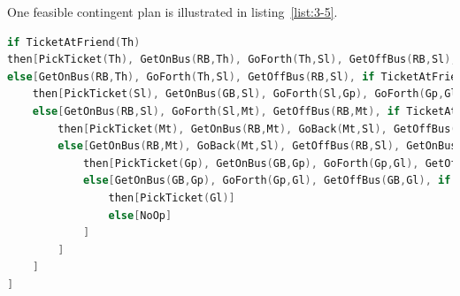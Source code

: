 \documentclass[11pt,a4paper]{article}
\begin{document}
\par One feasible contingent plan is illustrated in listing~\ref{list:3-5}.
\begin{lstlisting}[language=C++, caption={One feasible contingent plan.}, label=list:3-5]
if TicketAtFriend(Th)
then[PickTicket(Th), GetOnBus(RB,Th), GoForth(Th,Sl), GetOffBus(RB,Sl), GetOnBus(GB,Sl), GoForth(Sl,Gp), GoForth(Gp,Gl), GetOffBus(GB,Gl)]
else[GetOnBus(RB,Th), GoForth(Th,Sl), GetOffBus(RB,Sl), if TicketAtFriend(Sl)
	then[PickTicket(Sl), GetOnBus(GB,Sl), GoForth(Sl,Gp), GoForth(Gp,Gl), GetOffBus(GB,Gl)]
	else[GetOnBus(RB,Sl), GoForth(Sl,Mt), GetOffBus(RB,Mt), if TicketAtFriend(Mt)
		then[PickTicket(Mt), GetOnBus(RB,Mt), GoBack(Mt,Sl), GetOffBus(RB,Sl), GetOnBus(GB,Sl), GoForth](Sl,Gp), GoForth(Gp,Gl), GetOffBus(GB,Gl)]
		else[GetOnBus(RB,Mt), GoBack(Mt,Sl), GetOffBus(RB,Sl), GetOnBus(GB,Sl), GoForth](Sl,Gp), GetOffBus(GB,Gp), if TicketAtFriend(Gp)
			then[PickTicket(Gp), GetOnBus(GB,Gp), GoForth(Gp,Gl), GetOffBus(GB,Gl)]
			else[GetOnBus(GB,Gp), GoForth(Gp,Gl), GetOffBus(GB,Gl), if TicketAtFriend(Gl)
				then[PickTicket(Gl)]
				else[NoOp]
			]
		]
	]
]
\end{lstlisting}
\end{document}
